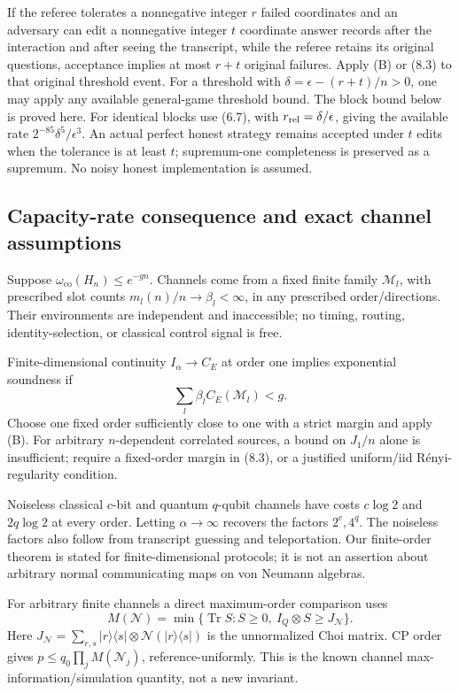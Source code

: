 \documentclass[11pt,reqno]{amsart}
\numberwithin{equation}{section}
\begin{document}
If the referee tolerates a nonnegative integer \(r\) failed coordinates and an adversary can edit a nonnegative integer \(t\) coordinate answer records after the interaction and after seeing the transcript, while the referee retains its original questions, acceptance implies at most \(r+t\) original failures. Apply (B) or (8.3) to that original threshold event. For a threshold with \(\delta=\epsilon-(r+t)/n>0\), one may apply any available general-game threshold bound. The block bound below is proved here. For identical blocks use (6.7), with \(r_{\rm rel}=\delta/\epsilon\), giving the available rate \(2^{-85}\delta^5/\epsilon^3\). An actual perfect honest strategy remains accepted under \(t\) edits when the tolerance is at least \(t\); supremum-one completeness is preserved as a supremum. No noisy honest implementation is assumed.

\subsection{Capacity-rate consequence and exact channel assumptions}\label{capacity-rate-consequence-and-exact-channel-assumptions}

Suppose \(\omega_{\mathrm{co}}(H_n)\le e^{-gn}\). Channels come from a fixed finite family \(\mathcal M_l\), with prescribed slot counts \(m_l(n)/n\to\beta_l<\infty\), in any prescribed order/directions. Their environments are independent and inaccessible; no timing, routing, identity-selection, or classical control signal is free.

Finite-dimensional continuity \(I_\alpha\to C_E\) at order one implies exponential soundness if \[
 \sum_l\beta_lC_E(\mathcal M_l)<g. \tag{8.5}
\] Choose one fixed order sufficiently close to one with a strict margin and apply (B). For arbitrary \(n\)-dependent correlated sources, a bound on \(J_1/n\) alone is insufficient; require a fixed-order margin in (8.3), or a justified uniform/iid Rényi-regularity condition.

Noiseless classical \(c\)-bit and quantum \(q\)-qubit channels have costs \(c\log2\) and \(2q\log2\) at every order. Letting \(\alpha\to\infty\) recovers the factors \(2^c,4^q\). The noiseless factors also follow from transcript guessing and teleportation. Our finite-order theorem is stated for finite-dimensional protocols; it is not an assertion about arbitrary normal communicating maps on von Neumann algebras.

For arbitrary finite channels a direct maximum-order comparison uses \[
 M(\mathcal N)=\min\{\operatorname{Tr}S:
              S\ge0,\ I_Q\otimes S\ge J_{\mathcal N}\}.
\] Here \(J_{\mathcal N}=\sum_{r,s}|r\rangle\langle s|\otimes\mathcal N(|r\rangle\langle s|)\) is the unnormalized Choi matrix. CP order gives \(p\le q_0\prod_jM(\mathcal N_j)\), reference-uniformly. This is the known channel max-information/simulation quantity, not a new invariant.
\end{document}
